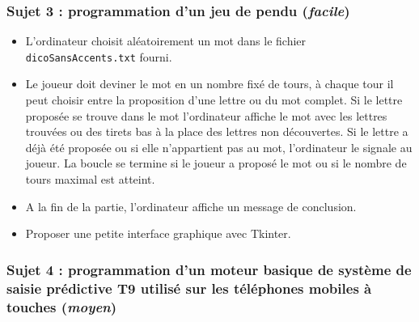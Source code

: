 \documentclass[a4paper, french, 12pt]{article}  %
\newcounter{prop}
\begin{document}
\subsubsection{Sujet 3 : programmation d'un jeu de pendu (\textit{facile})}


\begin{itemize}[label=]

	\item L'ordinateur choisit aléatoirement un mot dans le fichier \texttt{dicoSansAccents.txt} fourni.
	
	\item Le joueur  doit deviner le mot en un nombre fixé de tours, à chaque tour il peut choisir entre la  proposition d'une lettre ou du mot complet. Si le lettre proposée  se trouve dans le mot l'ordinateur affiche le mot avec les lettres trouvées ou des tirets bas à la place des lettres non découvertes. Si le lettre a déjà été proposée ou si elle n'appartient pas au mot, l'ordinateur le signale au joueur. La boucle se termine si le joueur a proposé le mot ou si le nombre de tours maximal  est atteint.
	
	\item A la fin de la partie, l'ordinateur affiche un message de conclusion.	
 
	\item Proposer une petite interface graphique avec Tkinter.
\end{itemize}
	
	
	 
\subsubsection{Sujet 4 : programmation d'un moteur basique de système de saisie prédictive T9 utilisé sur les téléphones mobiles à touches (\textit{moyen})}
\end{document}
